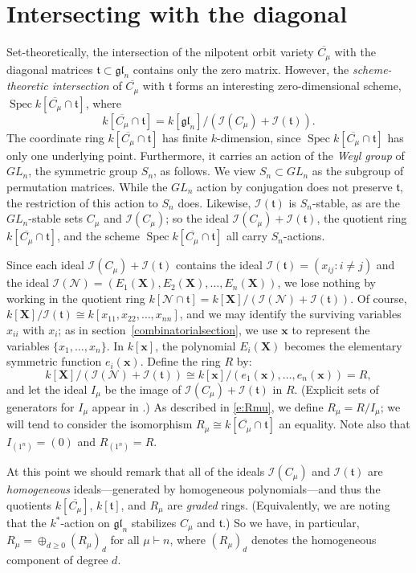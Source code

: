 \documentclass[12pt]{article}
\newcommand{\set}[1]{\{#1\}}
\newcommand{\isom}{\cong}
\newcommand{\ptn}{\vdash}
\newcommand{\x}{\mathbf{x}}
\newcommand{\X}{\mathbf{X}}
\newcommand{\var}[2]{{#1}_{1},\dots,{#1}_{#2}}
\newcommand{\dsum}{\oplus}
\newcommand{\I}{{\mathcal{I}}}
\newcommand{\Sn}{S_{n}}
\newcommand{\GLn}{{GL}_{n}}
\newcommand{\gln}{{\mathfrak{gl}}_{n}}
\newcommand{\n}{{\mathcal{N}}}
\newcommand{\Cmu}{C_{\mu}}
\newcommand{\closure}[1]{\overline{#1}}
\newcommand{\Cbar}[1]{\closure{C_{#1}}}
\newcommand{\Cmubar}{\Cbar{\mu}}
\newcommand{\Rmu}{R_{\mu}}
\newcommand{\Imu}{I_{\mu}}
\renewcommand{\t}{{\mathfrak{t}}}
\newcommand{\ideal}{\I}
\newcommand{\Spec}{\operatorname{Spec}}
\numberwithin{equation}{section}
\theoremstyle{plain}
\theoremstyle{definition}
\theoremstyle{remark}
\begin{document}
\section{Intersecting with the diagonal}
\label{sec:intersectdiagonal}
Set-theoretically, the intersection of the nilpotent orbit variety
$\Cmubar$ with the diagonal matrices $\t\subset\gln$ contains only the
zero matrix.  However, the {\em scheme-theoretic intersection} of
$\Cmubar$ with $\t$ forms an interesting zero-dimensional scheme,
$\Spec k[\Cmubar\cap\t]$, where 
\begin{equation}
k[\Cmubar\cap\t]= k[\gln]/(\ideal(\Cmu)+\ideal(\t)).
\end{equation}
The coordinate ring $k[\Cmubar\cap\t]$ has finite $k$-dimension, since
$\Spec k[\Cmubar\cap\t]$ has only one underlying point.  Furthermore,
it carries an action of the {\em Weyl group} of $\GLn$, the symmetric
group $S_n$, as follows.  We view $\Sn\subset\GLn$ as the subgroup of
permutation matrices.  While the $\GLn$ action by conjugation does not
preserve $\t$, the restriction of this action to $\Sn$ does.
Likewise, $\I(\t)$ is $\Sn$-stable, as are the $\GLn$-stable sets
$\Cmu$ and $\I(\Cmu)$; so the ideal $\I(\Cmu)+\I(\t)$, the quotient
ring $k[\Cmubar\cap\t]$, and the scheme $\Spec k[\Cmubar\cap\t]$ all
carry $\Sn$-actions.

Since each ideal $\I(\Cmu)+\I(\t)$ contains the ideal
$\ideal(\t)=(x_{ij}: i\neq j)$ and the ideal
$\ideal(\n)=(E_{1}(\X),E_{2}(\X),\dots,E_{n}(\X))$, we lose nothing by
working in the quotient ring $k[\n\cap\t]=k[\X]/(\I(\n)+\I(\t))$.  Of course,
$k[\X]/\I(\t)\isom k[x_{11},x_{22},\dots,x_{nn}]$, and we may identify
the surviving variables $x_{ii}$ with $x_i$; as in
section~\ref{combinatorialsection}, we use $\x$ to represent the
variables $\set{\var xn}$.  In $k[\x]$, the polynomial $E_i(\X)$ becomes the
elementary symmetric function $e_i(\x)$.  Define the ring $R$ by: 
\begin{equation}
k[\X]/(\I(\n)+\I(\t)) \isom k[\x]/(e_{1}(\x), \dots, e_{n}(\x)) = R,
\end{equation}
and let the ideal $\Imu$ be the image of $\I(\Cmu)+\I(\t)$ in $R$.
(Explicit sets of generators for $I_{\mu}$ appear in
\cite{deConcini&Procesi, Tanisaki, Garsia&Procesi}.)  As described in
\eqref{e:Rmu}, we define $\Rmu=R/\Imu$; we will tend to consider the
isomorphism $\Rmu\isom k[\Cmubar\cap\t]$ an equality.  Note
also that $I_{(1^n)}=(0)$ and $R_{(1^n)}=R$.

At this point we should remark that all of the ideals $\I(\Cmu)$ and 
$\ideal(\t)$ are {\em homogeneous} ideals---generated by homogeneous 
polynomials---and thus the quotients $k[\Cmubar]$, $k[\t]$, 
and $\Rmu$ are {\em graded} rings.  (Equivalently, we are noting that 
the $k^{*}$-action on $\gln$ stabilizes $\Cmu$ and $\t$.)  So we 
have, in particular, $\Rmu=\dsum_{d\geq0}(\Rmu)_{d}$ for all $\mu\ptn
n$, where $(R_{\mu })_{d}$ denotes the homogeneous component of degree
$d$.
\end{document}
